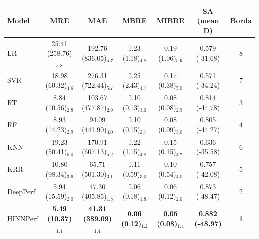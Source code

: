 \begin{tabular}{lcccccc}
\toprule
Model & MRE & MAE & MBRE & MIBRE & SA (mean D) & Borda \\
\midrule
LR & 25.41 (258.76)$_{5.8}$ & 192.76 (836.05)$_{5.7}$ & 0.23 (1.18)$_{4.8}$ & 0.19 (1.06)$_{5.9}$ & 0.579 (-31.68) & 8 \\
SVR & 18.98 (60.32)$_{4.6}$ & 276.31 (722.44)$_{5.7}$ & 0.25 (2.43)$_{4.7}$ & 0.17 (0.38)$_{5.0}$ & 0.571 (-34.24) & 7 \\
RT & 8.84 (10.56)$_{2.8}$ & 103.67 (477.87)$_{2.9}$ & 0.10 (0.13)$_{3.0}$ & 0.08 (0.08)$_{2.9}$ & 0.814 (-44.78) & 3 \\
RF & 8.93 (14.23)$_{2.9}$ & 94.09 (441.90)$_{3.0}$ & 0.10 (0.15)$_{2.7}$ & 0.08 (0.09)$_{3.0}$ & 0.805 (-44.27) & 4 \\
KNN & 19.23 (50.41)$_{5.0}$ & 170.91 (607.13)$_{5.2}$ & 0.22 (1.15)$_{4.8}$ & 0.15 (0.15)$_{4.7}$ & 0.636 (-35.58) & 6 \\
KRR & 10.80 (98.34)$_{3.6}$ & 65.71 (501.30)$_{3.1}$ & 0.11 (0.59)$_{3.0}$ & 0.10 (0.54)$_{4.0}$ & 0.757 (-42.08) & 5 \\
DeepPerf & 5.94 (15.59)$_{2.0}$ & 47.30 (405.85)$_{1.8}$ & 0.06 (0.18)$_{1.8}$ & 0.06 (0.12)$_{2.0}$ & 0.873 (-48.47) & 2 \\
HINNPerf & \textbf{5.49 (10.37)$_{1.4}$} & \textbf{41.31 (389.09)$_{1.4}$} & \textbf{0.06 (0.12)$_{1.2}$} & \textbf{0.05 (0.08)$_{1.4}$} & \textbf{0.882 (-48.97)} & \textbf{1} \\
\bottomrule
\end{tabular}
